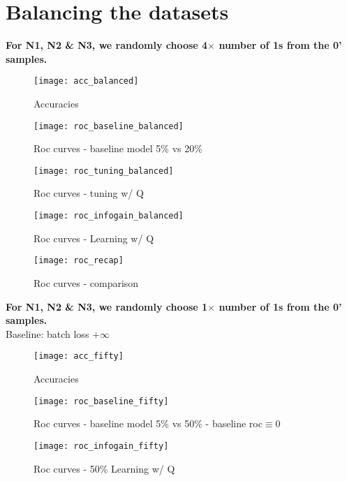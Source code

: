 \documentclass[10pt]{article}
\newcommand{\1}{\mathbbm{1}}
\newcommand{\0}{\mathbf{0}}
\begin{document}
\section{Balancing the datasets}
\textbf{For N1, N2 \& N3, we randomly choose 4$\times$ number of 1s from the 0' samples.}


\begin{figure}[H]
    \centering
    \texttt{[image: acc\_balanced]}
    \caption{Accuracies}
\end{figure}

\begin{figure}[H]
    \centering
    \texttt{[image: roc\_baseline\_balanced]}
    \caption{Roc curves - baseline model 5\% vs 20\%}
\end{figure}

\begin{figure}[H]
    \centering
    \texttt{[image: roc\_tuning\_balanced]}
    \caption{Roc curves - tuning w/ Q}
\end{figure}

\begin{figure}[H]
    \centering
    \texttt{[image: roc\_infogain\_balanced]}
    \caption{Roc curves - Learning w/ Q}
\end{figure}

\begin{figure}[H]
    \centering
    \texttt{[image: roc\_recap]}
    \caption{Roc curves - comparison}
\end{figure}
\textbf{For N1, N2 \& N3, we randomly choose 1$\times$ number of 1s from the 0' samples.}\\
Baseline: batch loss $+\infty$
\begin{figure}[H]
    \centering
    \texttt{[image: acc\_fifty]}
    \caption{Accuracies}
\end{figure}

\begin{figure}[H]
    \centering
    \texttt{[image: roc\_baseline\_fifty]}
    \caption{Roc curves - baseline model 5\% vs 50\% - baseline roc$\equiv 0$}
\end{figure}

\begin{figure}[H]
    \centering
    \texttt{[image: roc\_infogain\_fifty]}
    \caption{Roc curves - 50\% Learning w/ Q}
\end{figure}
\end{document}
